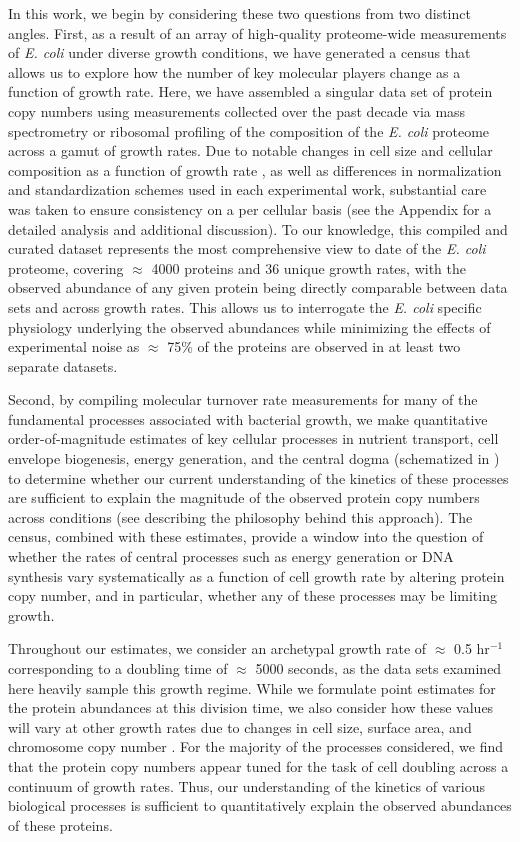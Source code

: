 In this work, we begin by considering these two questions from two distinct
angles. First, as a result of an array of high-quality proteome-wide
measurements of \textit{E. coli} under diverse growth conditions, we have
generated a census that allows us to explore how the number of key molecular
players change as a function of growth rate. Here, we have assembled a singular
data set of protein copy numbers using measurements collected over the past
decade via mass spectrometry \citep{schmidt2016, peebo2015, valgepea2013} or
ribosomal profiling \citep{li2014} of the composition of the \textit{E. coli}
proteome across a gamut of growth rates. Due to notable changes in cell size and
cellular composition as a function of growth rate \citep{bremer2008,
taheriaraghi2015}, as well as differences in normalization and standardization
schemes used in each experimental work, substantial care was taken to ensure
consistency on a per cellular basis (see the Appendix for a detailed analysis
and additional discussion). To our knowledge, this compiled and curated dataset
represents the most comprehensive view to date of the \textit{E. coli} proteome,
covering $\approx$ 4000 proteins and 36 unique growth rates, with the observed
abundance of any given protein being directly comparable between data sets and
across growth rates. This allows us to interrogate  the \textit{E. coli}
specific physiology underlying the observed abundances while  minimizing the
effects of experimental noise as  $\approx$ 75\% of the  proteins are observed
in at least two separate datasets.

Second, by compiling molecular turnover rate measurements for many of the
fundamental processes associated with bacterial growth, we make quantitative
order-of-magnitude estimates of key cellular processes in nutrient transport,
cell envelope biogenesis, energy generation, and the central dogma (schematized
in ) to determine whether our current understanding of the
kinetics of these processes are sufficient to explain the magnitude of the
observed protein copy numbers across conditions (see 
describing the philosophy behind this approach). The census, combined with these
estimates, provide a window into the question of whether the rates of central
processes such as energy generation or DNA synthesis vary systematically as a
function of cell growth rate by altering protein copy number, and in particular,
whether any of these processes may be limiting growth.

Throughout our estimates, we consider an archetypal growth rate of $\approx$
0.5 hr$^{-1}$ corresponding to a doubling time of $\approx$ 5000 seconds, as
the data sets examined here heavily sample this growth regime. While we
formulate point estimates for the protein abundances at this division time,
we also consider how these values will vary at other growth rates due to
changes in cell size, surface area, and chromosome copy number
\citep{taheriaraghi2015, harris2018}. For the majority of the processes
considered, we find that the protein copy numbers appear tuned for the task
of cell doubling across a continuum of growth rates. Thus, our understanding
of the kinetics of various biological processes is sufficient to
quantitatively explain the observed abundances of these proteins.

